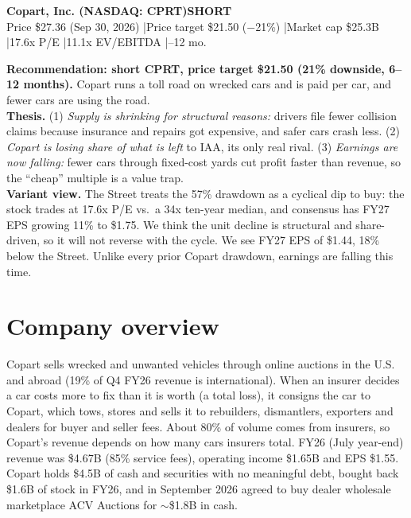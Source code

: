 \documentclass[10pt]{article}
\begin{document}
\small

{\color{navy}\Large\bfseries Copart, Inc. (NASDAQ: CPRT)}\hfill{\color{navy}\bfseries\Large SHORT}\\[1pt]
{\footnotesize Price \$27.36 (Sep 30, 2026) \quad|\quad Price target \$21.50 ($-$21\%) \quad|\quad Market cap \$25.3B \quad|\quad 17.6x P/E \quad|\quad 11.1x EV/EBITDA \quad|--12 mo.}

\vspace{3pt}
\colorbox{soft}{\parbox{\dimexpr\linewidth-2\fboxsep}{
\textbf{Recommendation: short CPRT, price target \$21.50 (21\% downside, 6--12 months).} Copart runs a toll road on wrecked cars and is paid per car, and fewer cars are using the road.\\[2pt]
\textbf{Thesis.} (1) \emph{Supply is shrinking for structural reasons:} drivers file fewer collision claims because insurance and repairs got expensive, and safer cars crash less. (2) \emph{Copart is losing share of what is left} to IAA, its only real rival. (3) \emph{Earnings are now falling:} fewer cars through fixed-cost yards cut profit faster than revenue, so the ``cheap'' multiple is a value trap.\\[2pt]
\textbf{Variant view.} The Street treats the 57\% drawdown as a cyclical dip to buy: the stock trades at 17.6x P/E vs.\ a 34x ten-year median, and consensus has FY27 EPS growing 11\% to \$1.75. We think the unit decline is structural and share-driven, so it will not reverse with the cycle. We see FY27 EPS of \$1.44, 18\% below the Street. Unlike every prior Copart drawdown, earnings are falling this time.}}

\section{Company overview}
Copart sells wrecked and unwanted vehicles through online auctions in the U.S. and abroad (19\% of Q4 FY26 revenue is international). When an insurer decides a car costs more to fix than it is worth (a total loss), it consigns the car to Copart, which tows, stores and sells it to rebuilders, dismantlers, exporters and dealers for buyer and seller fees. About 80\% of volume comes from insurers, so Copart's revenue depends on how many cars insurers total. FY26 (July year-end) revenue was \$4.67B (85\% service fees), operating income \$1.65B and EPS \$1.55. Copart holds \$4.5B of cash and securities with no meaningful debt, bought back \$1.6B of stock in FY26, and in September 2026 agreed to buy dealer wholesale marketplace ACV Auctions for $\sim$\$1.8B in cash.
\end{document}
